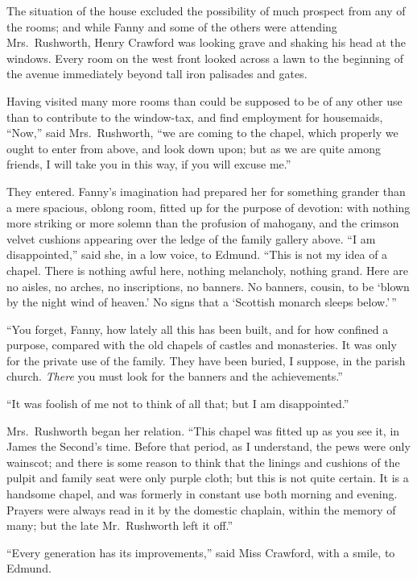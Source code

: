 \documentclass{article}
\begin{document}
The situation of the house excluded the possibility
of much prospect from any of the rooms; and while Fanny
and some of the others were attending Mrs.\ Rushworth,
Henry Crawford was looking grave and shaking his head
at the windows.  Every room on the west front looked
across a lawn to the beginning of the avenue immediately
beyond tall iron palisades and gates.

Having visited many more rooms than could be supposed to be
of any other use than to contribute to the window-tax, and
find employment for housemaids, ``Now,'' said Mrs.\ Rushworth,
``we are coming to the chapel, which properly we ought
to enter from above, and look down upon; but as we
are quite among friends, I will take you in this way,
if you will excuse me.''

They entered.  Fanny's imagination had prepared her
for something grander than a mere spacious, oblong room,
fitted up for the purpose of devotion:  with nothing more
striking or more solemn than the profusion of mahogany,
and the crimson velvet cushions appearing over the ledge
of the family gallery above.  ``I am disappointed,''
said she, in a low voice, to Edmund.  ``This is not
my idea of a chapel.  There is nothing awful here,
nothing melancholy, nothing grand.  Here are no aisles,
no arches, no inscriptions, no banners.  No banners,
cousin, to be `blown by the night wind of heaven.'
No signs that a `Scottish monarch sleeps below.'\,''

``You forget, Fanny, how lately all this has been built,
and for how confined a purpose, compared with the old
chapels of castles and monasteries.  It was only for
the private use of the family.  They have been buried,
I suppose, in the parish church.  \emph{There} you must look
for the banners and the achievements.''

``It was foolish of me not to think of all that; but I
am disappointed.''

Mrs.\ Rushworth began her relation.  ``This chapel was fitted up
as you see it, in James the Second's time.  Before that period,
as I understand, the pews were only wainscot; and there
is some reason to think that the linings and cushions
of the pulpit and family seat were only purple cloth;
but this is not quite certain.  It is a handsome chapel,
and was formerly in constant use both morning and evening.
Prayers were always read in it by the domestic chaplain,
within the memory of many; but the late Mr.\ Rushworth left
it off.''

``Every generation has its improvements,'' said Miss Crawford,
with a smile, to Edmund.
\end{document}
